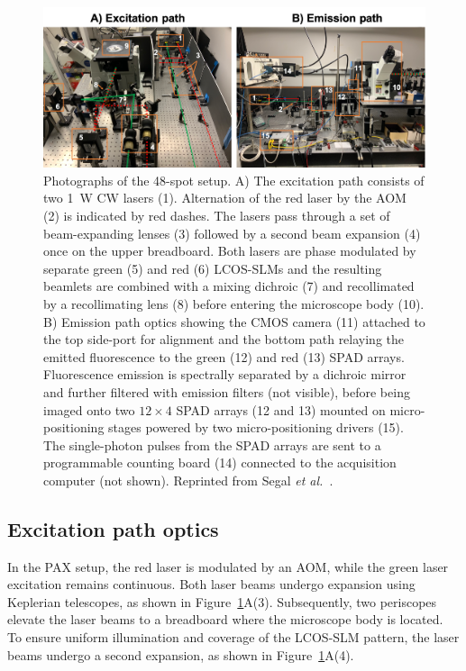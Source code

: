 \begin{figure}
\centering\includegraphics[width=1.0\linewidth]{chapters/figures/setup_photos.png}
\caption{\label{fig:setup_photos} Photographs of the 48-spot setup.
A) The excitation path consists of two 1~W \ac{CW} lasers (1). 
Alternation of the red laser by the \ac{AOM} (2) is indicated by red dashes. 
The lasers pass through a set of beam-expanding lenses (3) followed by a second beam expansion (4) once on the upper breadboard.
Both lasers are phase modulated by separate green (5) and red (6) \ac{LCOS-SLM}s and the resulting beamlets are combined with a mixing dichroic (7) and recollimated by a recollimating lens (8) before entering the microscope body (10). 
B) Emission path optics showing the \ac{CMOS} camera (11) attached to the top side-port for alignment and the bottom path relaying the emitted fluorescence to the green (12) and red (13) \ac{SPAD} arrays. 
Fluorescence emission is spectrally separated by a dichroic mirror and further filtered with emission filters (not visible), before being imaged onto two $12\times4$ \ac{SPAD} arrays (12 and 13)  mounted on micro-positioning stages powered by two micro-positioning drivers (15).
The single-photon pulses from the \ac{SPAD} arrays are sent to a programmable counting board (14) connected to the acquisition computer (not shown).
Reprinted from Segal \textit{et al.}~\cite{segal_methods_2019}.
}
\end{figure}

\subsection{Excitation path optics}
\label{sec:excitation_optics}

In the \ac{PAX} setup, the red laser is modulated by an \ac{AOM}, while the green laser excitation remains continuous. 
Both laser beams undergo expansion using Keplerian telescopes, as shown in Figure~\ref{fig:setup_photos}A(3). 
Subsequently, two periscopes elevate the laser beams to a breadboard where the microscope body is located. 
To ensure uniform illumination and coverage of the \ac{LCOS-SLM} pattern, the laser beams undergo a second expansion, as shown in Figure~\ref{fig:setup_photos}A(4). 

